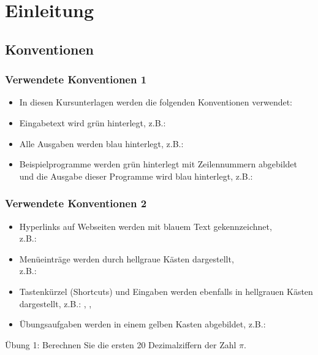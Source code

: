 



\setcounter{mchapter}{1}
\setcounter{mexercise}{0}


    

    \section{Einleitung}

    \subsection{Konventionen}
    \begin{frame}
        \frametitle{Verwendete Konventionen 1}
        \begin{itemize}
            \item In diesen Kursunterlagen werden die folgenden Konventionen verwendet:
            \item Eingabetext wird grün hinterlegt, z.B.: 
            \item Alle Ausgaben werden blau hinterlegt, z.B.: 
            \item Beispielprogramme werden grün hinterlegt mit Zeilennummern abgebildet und die Ausgabe dieser Programme
            wird blau hinterlegt, z.B.:
        \end{itemize}
        \vspace{-0.5cm}
    \end{frame}

    \begin{frame}
        \frametitle{Verwendete Konventionen 2}
        \begin{itemize}
            \item Hyperlinks auf Webseiten werden mit blauem Text gekennzeichnet, \\
            z.B.: 
            \item Menüeinträge werden durch hellgraue Kästen dargestellt, \\
            z.B.: 
            \item Tastenkürzel (Shortcuts) und Eingaben werden ebenfalls in hellgrauen Kästen dargestellt, z.B.: , \keys{\return}, 
            \item Übungsaufgaben werden in einem gelben Kasten abgebildet, z.B.:
        \end{itemize}
        \begin{exercise}
            \sloppy
            Übung 1: Berechnen Sie die ersten 20 Dezimalziffern der Zahl $\pi$.
        \end{exercise}
    \end{frame}

